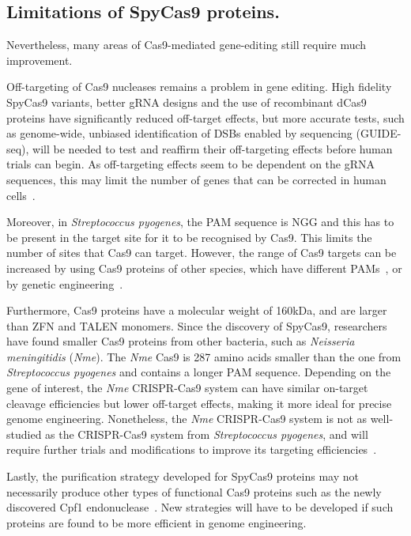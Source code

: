 \documentclass[11pt]{article}
\begin{document}
\subsection{Limitations of SpyCas9 proteins.}

Nevertheless, many areas of Cas9-mediated gene-editing still require much improvement. 

Off-targeting of Cas9 nucleases remains a problem in gene editing. High fidelity SpyCas9 variants, better gRNA designs and the use of recombinant dCas9 proteins have significantly reduced off-target effects, but more accurate tests, such as genome-wide, unbiased identification of DSBs enabled by sequencing (GUIDE-seq), will be needed to test and reaffirm their off-targeting effects before human trials can begin. As off-targeting effects seem to be dependent on the gRNA sequences, this may limit the number of genes that can be corrected in human cells~\citep{Fu2013a, OGeen2015, Ramalingam2013, Stemmer2015}.

Moreover, in \textit{Streptococcus pyogenes}, the PAM sequence is NGG and this has to be present in the target site for it to be recognised by Cas9. This limits the number of sites that Cas9 can target. However, the range of Cas9 targets can be increased by using Cas9 proteins of other species, which have different PAMs~\citep{Hou2013a}, or by genetic engineering~\citep{Kleinstiver2015}. 

Furthermore, Cas9 proteins have a molecular weight of 160kDa, and are larger than ZFN and TALEN monomers. Since the discovery of SpyCas9, researchers have found smaller Cas9 proteins from other bacteria, such as \textit{Neisseria meningitidis} (\textit{Nme}). The \textit{Nme} Cas9 is 287 amino acids smaller than the one from \textit{Streptococcus pyogenes} and contains a longer PAM sequence. Depending on the gene of interest, the \textit{Nme} CRISPR-Cas9 system can have similar on-target cleavage efficiencies but lower off-target effects, making it more ideal for precise genome engineering. Nonetheless, the \textit{Nme} CRISPR-Cas9 system is not as well-studied as the CRISPR-Cas9 system from \textit{Streptococcus pyogenes}, and will require further trials and modifications to improve its targeting efficiencies~\citep{Lee2016}.

Lastly, the purification strategy developed for SpyCas9 proteins may not necessarily produce other types of functional Cas9 proteins such as the newly discovered Cpf1 endonuclease~\citep{Zetsche2015}. New strategies will have to be developed if such proteins are found to be more efficient in genome engineering.
\end{document}
